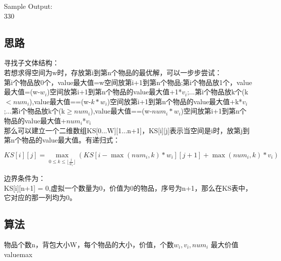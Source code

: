 \documentclass[UTF8]{ctexart}
\begin{document}
Sample Output:\\
330\\

\subsection{思路}
寻找子文体结构：\\
若想求得空间为w时，存放第i到第n个物品的最优解，可以一步步尝试：\\
第i个物品放0个，value最大值=w空间放第i+1到第n个物品;第i个物品放1个，value最大值=(w-$w_i$)空间放第i+1到第n个物品的value最大值+1*$v_i$;...第i个物品放k个(k$< num_i$),value最大值==(w-$k*w_i$)空间放第i+1到第n个物品的value最大值+k*$v_i$;...第i个物品放k个(k$\ge num_i$),value最大值==(w-$num_i*w_i$)空间放第i+1到第n个物品的value最大值+$num_i$*$v_i$\\
那么可以建立一个二维数组KS[0...W][1...n+1]，KS[i][j]表示当空间是i时，放第j到第n个物品的value最大值。有递归式：\\
\begin{center}
$KS[i][j]=\max\limits_{0\le k\le \lfloor\frac{j}{w_i}\rfloor}(KS[i-\max(num_i,k)*w_i][j+1]+\max(num_i,k)*v_i)$
\end{center}
边界条件为：\\
KS[i][n+1] = 0,虚拟一个数量为0，价值为0的物品，序号为n+1，那么在KS表中，它对应的那一列均为0。

\subsection{算法}

\renewcommand{\algorithmicrequire}{\textbf{输入:}}
\renewcommand{\algorithmicensure}{\textbf{输出:}}
\begin{algorithm}
	\caption{}
	\begin{algorithmic}[1]
	\Require 物品个数n，背包大小W，每个物品的大小，价值，个数$w_i,v_i,num_i$
	\Ensure 最大价值valuemax
	\EndFor
				\Else
				\EndIf
				\EndIf
			\EndFor
		\EndFor
	\EndFor\\
	\end{algorithmic}
\end{algorithm}
\end{document}
